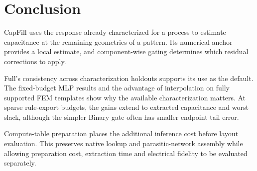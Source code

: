 \documentclass[conference,9pt,letterpaper]{IEEEtran}
\begin{document}
\section{Conclusion}
CapFill uses the response already characterized for a process to estimate capacitance at the remaining geometries of a pattern. Its numerical anchor provides a local estimate, and component-wise gating determines which residual corrections to apply.

Full's consistency across characterization holdouts supports its use as the default. The fixed-budget MLP results and the advantage of interpolation on fully supported FEM templates show why the available characterization matters. At sparse rule-export budgets, the gains extend to extracted capacitance and worst slack, although the simpler Binary gate often has smaller endpoint tail error.

Compute-table preparation places the additional inference cost before layout evaluation. This preserves native lookup and parasitic-network assembly while allowing preparation cost, extraction time and electrical fidelity to be evaluated separately.
\clearpage
\ifdefined\CapFillExtended\else{}\fi
\newcommand{\BIBdecl}{\raggedright}


\end{document}
